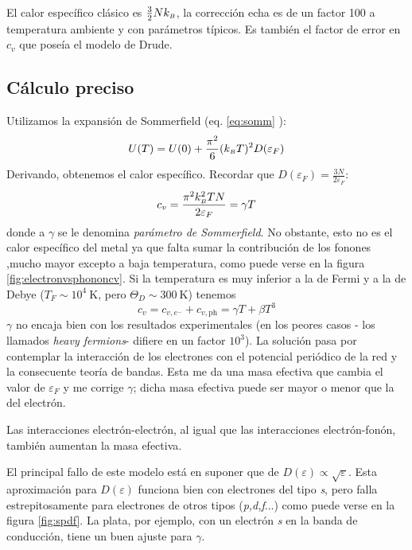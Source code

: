 El calor específico clásico es $\frac{3}{2}Nk_{\scriptscriptstyle{B}} $, la corrección echa
es de un factor 100 a temperatura ambiente y con parámetros
típicos. Es también el factor de error en $c_v$ que poseía el modelo
de Drude.

\subsection{Cálculo preciso}
\label{subsec:accurate}

Utilizamos la expansión de Sommerfield (eq. \ref{eq:somm} ):
\begin{equation}
  U(T) = U(0) + \frac{\pi^2}{6}(k_{\scriptscriptstyle{B}}  T)^2 D(\varepsilon_F)
\end{equation}
Derivando, obtenemos el calor específico. Recordar que
$D(\varepsilon_F) = \frac{3N}{2\varepsilon_F}$:
\begin{equation}
  c_v = \frac{\pi^2 k_{\scriptscriptstyle{B}} ^2 T N}{2 \varepsilon_F} = \gamma T
\end{equation}
donde a $\gamma$ se le denomina \emph{parámetro de Sommerfield}. No
obstante, esto no es el calor específico del metal ya que falta
sumar la contribución de los fonones ,mucho mayor excepto a baja
temperatura, como puede verse en la figura
\ref{fig:electronvsphononcv}. Si la temperatura es muy
inferior a la de Fermi y a la de Debye ($T_F \sim 10^4 \ \text{K}$,
pero $\Theta_D \sim 300 \ \text{K}$) tenemos
\begin{equation}
  c_v = c_{v,e^{-}} + c_{v,\text{ph}} = \gamma T + \beta T^3
\end{equation}
$\gamma$ no encaja bien con los resultados experimentales
(en los peores casos - los llamados \emph{heavy fermions}- difiere en
un factor $10^3$). La solución pasa por contemplar la interacción de
los electrones con el potencial periódico de la red y la consecuente
teoría de bandas. Esta me da una masa efectiva que cambia el valor de
$\varepsilon_F$ y me corrige $\gamma$; dicha masa efectiva puede ser
mayor o menor que la del electrón.

Las interacciones electrón-electrón, al igual que las interacciones
electrón-fonón, también aumentan la masa efectiva.

El principal fallo de este modelo está en suponer que de
$D(\varepsilon) \propto \sqrt \varepsilon$. Esta aproximación para $D(\varepsilon)$ funciona bien con
electrones del tipo \emph{s}, pero falla estrepitosamente para
electrones de otros tipos (\emph{p,d,f}...) como puede verse en la
figura \ref{fig:spdf}. La plata, por ejemplo,
con un electrón \emph{s} en la banda de conducción, tiene un buen
ajuste para $\gamma$.

